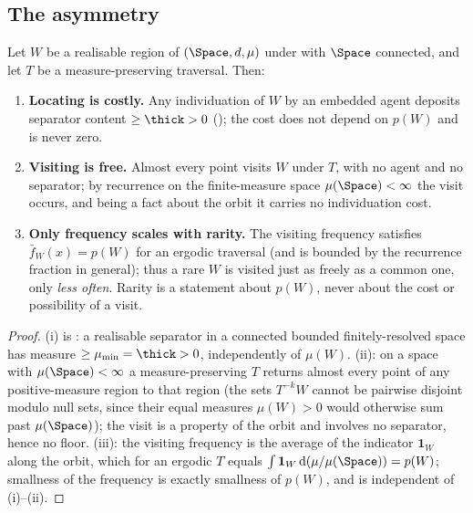 \subsection{The asymmetry}

\begin{theorem}
\label{thm:asymmetry}
Let $W$ be a realisable region of $(\Space,d,\mu)$ under  with
$\Space$ connected, and let $T$ be a measure-preserving traversal. Then:
\begin{enumerate}[label=\textup{(\roman*)},leftmargin=2.4em]
\item \textbf{Locating is costly.} Any individuation of $W$ by an embedded agent
deposits separator content $\ge\thick>0$ \textup{(}\textup{)};
the cost does not depend on $p(W)$ and is never zero.
\item \textbf{Visiting is free.} Almost every point visits $W$ under $T$, with no
agent and no separator; by recurrence on the finite-measure space
$\mu(\Space)<\infty$ the visit occurs, and being a fact about the orbit it carries
no individuation cost.
\item \textbf{Only frequency scales with rarity.} The visiting frequency satisfies
$\bar f_W(x)=p(W)$ for an ergodic traversal \textup{(}and is bounded by the
recurrence fraction in general\textup{)}; thus a rare $W$ is visited just as
freely as a common one, only \emph{less often}. Rarity is a statement about
$p(W)$, never about the cost or possibility of a visit.
\end{enumerate}
\end{theorem}

\begin{proof}
(i) is : a realisable separator in a connected bounded
finitely-resolved space has measure $\ge\mu_{\min}=\thick>0$, independently of
$\mu(W)$. (ii): on a space with $\mu(\Space)<\infty$ a measure-preserving $T$
returns almost every point of any positive-measure region to that region (the sets
$T^{-k}W$ cannot be pairwise disjoint modulo null sets, since their equal measures
$\mu(W)>0$ would otherwise sum past $\mu(\Space)$); the visit is a property of the
orbit and involves no separator, hence no floor. (iii): the visiting frequency is
the average of the indicator $\mathbf 1_W$ along the orbit, which for an ergodic
$T$ equals $\int \mathbf 1_W\,\mathrm d(\mu/\mu(\Space))=p(W)$; smallness of the
frequency is exactly smallness of $p(W)$, and is independent of (i)--(ii).
\end{proof}

